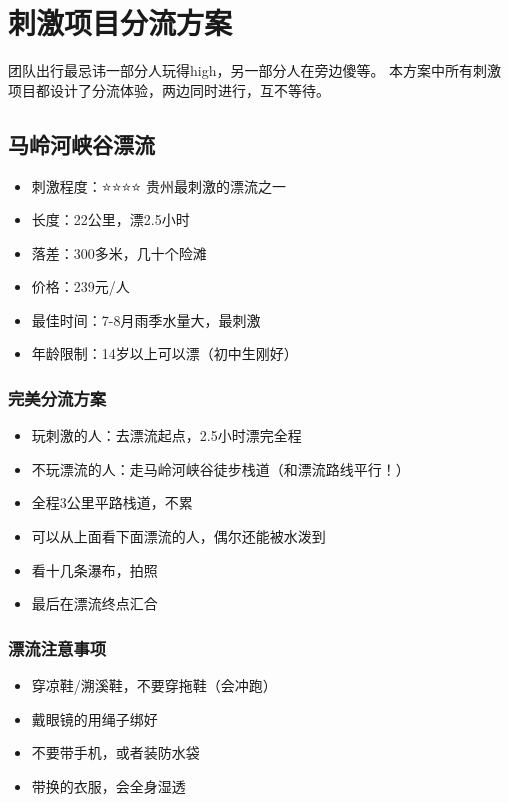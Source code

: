 \documentclass[12pt,a4paper,UTF8]{ctexart}
\begin{document}
\newpage

\section{刺激项目分流方案}

团队出行最忌讳一部分人玩得high，另一部分人在旁边傻等。
本方案中所有刺激项目都设计了分流体验，两边同时进行，互不等待。

\subsection{马岭河峡谷漂流}
\begin{itemize}
\item 刺激程度：⭐⭐⭐⭐ 贵州最刺激的漂流之一
\item 长度：22公里，漂2.5小时
\item 落差：300多米，几十个险滩
\item 价格：239元/人
\item 最佳时间：7-8月雨季水量大，最刺激
\item 年龄限制：14岁以上可以漂（初中生刚好）
\end{itemize}

\subsubsection{完美分流方案}
\begin{itemize}
\item 玩刺激的人：去漂流起点，2.5小时漂完全程
\item 不玩漂流的人：走马岭河峡谷徒步栈道（和漂流路线平行！）
\item 全程3公里平路栈道，不累
\item 可以从上面看下面漂流的人，偶尔还能被水泼到
\item 看十几条瀑布，拍照
\item 最后在漂流终点汇合
\end{itemize}

\subsubsection{漂流注意事项}
\begin{itemize}
\item 穿凉鞋/溯溪鞋，不要穿拖鞋（会冲跑）
\item 戴眼镜的用绳子绑好
\item 不要带手机，或者装防水袋
\item 带换的衣服，会全身湿透
\end{itemize}
\end{document}
